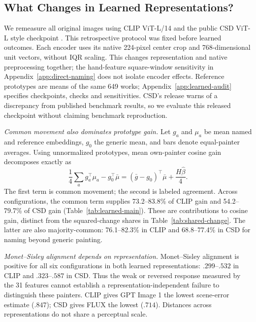 \subsection{What Changes in Learned Representations?}\label{sec:learned-results}
We remeasure all original images using CLIP ViT-L/14 \citep{radford2021}
and the public CSD ViT-L style checkpoint \citep{somepalli2024style}.
This retrospective protocol was fixed before learned outcomes. Each encoder
uses its native 224-pixel center crop and 768-dimensional unit vectors, without
IQR scaling. This changes representation and native preprocessing together;
the hand-feature square-window sensitivity in Appendix~\ref{app:direct-naming}
does not isolate encoder effects. Reference prototypes are means of the same 649 works;
Appendix~\ref{app:learned-audit} specifies checkpoints, checks and sensitivities.
CSD's release warns of a discrepancy from published benchmark results, so
we evaluate this released checkpoint without claiming benchmark reproduction.

\emph{Common movement also dominates prototype gain.}
Let $g_a$ and $\mu_a$ be mean named and reference embeddings, $g_0$ the generic
mean, and bars denote equal-painter averages. Using unnormalized prototypes,
mean own-painter cosine gain decomposes exactly as
\begin{equation}
\frac14\sum_a g_a^\top\mu_a-g_0^\top\bar\mu
=(\bar g-g_0)^\top\bar\mu+\frac{H\widehat\beta}{4}.
\label{eq:prototype-main}
\end{equation}
The first term is common movement; the second is labeled agreement.
Across configurations, the common term supplies 73.2--83.8\% of CLIP gain and
54.2--79.7\% of CSD gain (Table~\ref{tab:learned-main}). These are contributions
to cosine gain, distinct from the squared-change shares in
Table~\ref{tab:shared-change}. The latter are also majority-common:
76.1--82.3\% in CLIP and 68.8--77.4\% in CSD for naming beyond generic painting.



\emph{Monet--Sisley alignment depends on representation.}
Monet--Sisley alignment is positive for all six configurations in both learned
representations: $.299$--$.532$ in CLIP and $.323$--$.587$ in CSD. Thus the
weak or reversed response measured by the 31 features cannot establish a
representation-independent failure to distinguish these painters. CLIP gives
GPT Image 1 the lowest scene-error estimate ($.847$); CSD gives FLUX the
lowest ($.714$). Distances across representations do not share a perceptual scale.

